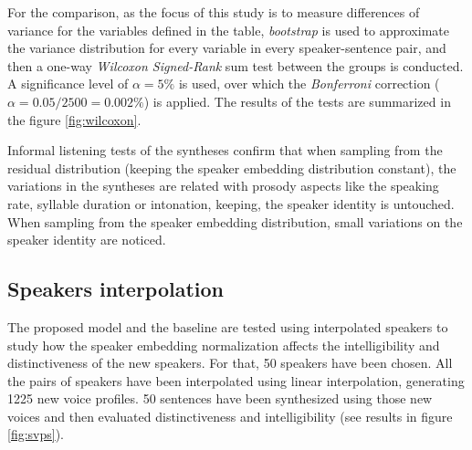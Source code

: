 For the comparison, as the focus of this study is to measure differences of variance for the variables defined in the table, \textit{bootstrap} is used to approximate the variance distribution for every variable in every speaker-sentence pair, and then a one-way \textit{Wilcoxon Signed-Rank} sum test between the groups is conducted. A significance level of $\alpha=5\%$ is used, over which the \textit{Bonferroni} correction ($\alpha=0.05/2500=0.002\%$) is applied. The results of the tests are summarized in the figure \ref{fig:wilcoxon}.

Informal listening tests of the syntheses confirm that when sampling from the residual distribution (keeping the speaker embedding distribution constant), the variations in the syntheses are related with prosody aspects like the speaking rate, syllable duration or intonation, keeping, the speaker identity is untouched. When sampling from the speaker embedding distribution, small variations on the speaker identity are noticed.



\subsection{Speakers interpolation}
The proposed model and the baseline are tested using interpolated speakers to study how the speaker embedding normalization affects the intelligibility and distinctiveness of the new speakers. For that, 50 speakers have been chosen. All the pairs of speakers have been interpolated using linear interpolation, generating 1225 new voice profiles. 50 sentences have been synthesized using those new voices and then evaluated distinctiveness and intelligibility (see results in figure  \ref{fig:svps}).


